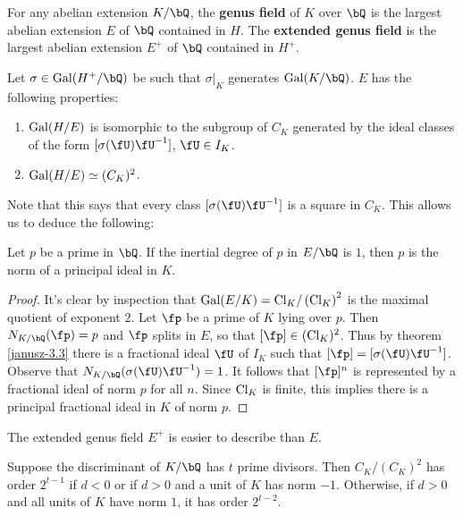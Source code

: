 \begin{defn}
    For any abelian extension $K / \bQ$, the \textbf{genus field} of $K$ over $\bQ$ is the largest abelian extension $E$ of $\bQ$ contained in $H$. The \textbf{extended genus field } is the largest abelian extension $E^{+}$ of $\bQ $ contained in $H^{+}$.
\end{defn}

Let $\sigma \in \Gal(H^{+} / \bQ)$ be such that $\sigma|_{K}$ generates $\Gal(K / \bQ)$. $E$ has the following properties:

\begin{thm}[Janusz 3.3]\label{janusz-3.3}
 
    \begin{enumerate}
        \item $\mathrm{Gal}(H / E)$ is isomorphic to the subgroup of $C_K$ generated by the ideal classes of the form $[\sigma(\fU)\fU^{-1}]$, $\fU \in I_K$. 
        \item $\mathrm{Gal}(H / E) \simeq (C_K)^2$. 
    \end{enumerate}
\end{thm}

Note that this says that every class $[\sigma(\fU) \fU^{-1}]$ is a square in $C_K$.
This allows us to deduce the following:

\begin{thm}\label{p-principal}
Let $p$ be a prime in $\bQ$. If the inertial degree of $p$ in $E / \bQ$ is $1$, then $p$ is the norm of a principal ideal in $K$. 
\end{thm} 

\begin{proof}
It's clear by inspection that $\mathrm{Gal}(E / K) = \mathrm{Cl}_K / \left(\mathrm{Cl}_K\right)^2$ is the maximal quotient of exponent $2$. Let $\fp$ be a prime of $K$ lying over $p$. Then $N_{K / \bQ}(\fp) = p$ and $\fp$ splits in $E$, so that $[\fp] \in (\Cl_K)^2$. Thus by theorem \ref{janusz-3.3} there is a fractional ideal $\fU$ of $I_K$ such that 
$[\fp] = [\sigma(\fU)\fU^{-1}]$. Observe that $N_{K / \bQ}(\sigma(\fU)\fU^{-1}) = 1$. It follows that $[\fp]^n$ is represented by a fractional ideal of norm $p$ for all $n$. Since $\mathrm{Cl}_K$ is finite, this implies there is a principal fractional ideal in $K$ of norm $p$. 
\end{proof}

The extended genus field $E^{+}$ is easier to describe than $E$.

\begin{thm} 
Suppose the discriminant of $K / \bQ$ has $t$ prime divisors. Then $C_K / (C_K)^2$ has order $2^{t-1}$ if $d < 0$ or if $d > 0$ and a unit of $K$ has norm $-1$. Otherwise, if $d>0$ and all units of $K$ have norm $1$, it has order $2^{t - 2}$.
\end{thm} 

